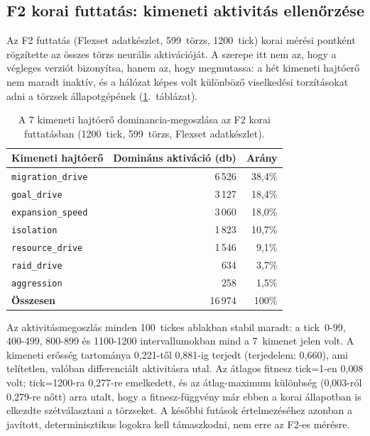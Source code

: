 ﻿\documentclass[a4paper,12pt]{report}
\begin{document}
\subsection*{F2 korai futtatás: kimeneti aktivitás ellenőrzése}

Az F2 futtatás (Flexset adatkészlet, 599~törzs, 1200~tick) korai mérési pontként
rögzítette az összes törzs neurális aktivációját. A szerepe itt nem az, hogy a
végleges verziót bizonyítsa, hanem az, hogy megmutassa: a hét kimeneti hajtóerő
nem maradt inaktív, és a hálózat képes volt különböző viselkedési torzításokat adni
a törzsek állapotgépének (\ref{tab:neurosim-f2-outputs}.~táblázat).

\begin{table}[h]
  \centering
  \caption{A 7 kimeneti hajtóerő dominancia-megoszlása az F2 korai futtatásban
    (1200~tick, 599~törzs, Flexset adatkészlet).}
  \label{tab:neurosim-f2-outputs}
  \begin{tabular}{lrr}
    \hline
    \textbf{Kimeneti hajtóerő} & \textbf{Domináns aktiváció (db)} & \textbf{Arány} \\
    \hline
    \texttt{migration\_drive} & 6\,526 & 38{,}4\% \\
    \texttt{goal\_drive}      & 3\,127 & 18{,}4\% \\
    \texttt{expansion\_speed} & 3\,060 & 18{,}0\% \\
    \texttt{isolation}        & 1\,823 & 10{,}7\% \\
    \texttt{resource\_drive}  & 1\,546 &  9{,}1\% \\
    \texttt{raid\_drive}      &   634 &  3{,}7\% \\
    \texttt{aggression}       &   258 &  1{,}5\% \\
    \hline
    \textbf{Összesen}         & 16\,974 & 100\% \\
    \hline
  \end{tabular}
\end{table}

Az aktivitásmegoszlás minden 100~tickes ablakban stabil maradt: a tick~0-99,
400-499, 800-899 és 1100-1200 intervallumokban mind a 7~kimenet jelen volt.
A kimeneti erősség tartománya 0{,}221-től 0{,}881-ig terjedt (terjedelem: 0{,}660),
ami telítetlen, valóban differenciált aktivitásra utal.
Az átlagos fitnesz tick=1-en 0{,}008 volt; tick=1200-ra 0{,}277-re emelkedett,
és az átlag-maximum különbség (0{,}003-ról 0{,}279-re nőtt) arra utalt,
hogy a fitnesz-függvény már ebben a korai állapotban is elkezdte szétválasztani
a törzseket. A későbbi futások értelmezéséhez azonban a javított, determinisztikus
logokra kell támaszkodni, nem erre az F2-es mérésre.
\end{document}
